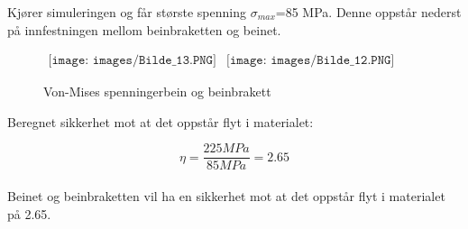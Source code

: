 Kjører simuleringen og får største spenning $\sigma_{max}$=85 MPa. Denne oppstår nederst på innfestningen mellom beinbraketten og beinet.

\begin{figure}[H]
\begin{center}$
\begin{array}{ccc}
\texttt{[image: images/Bilde\_13.PNG]} &
\texttt{[image: images/Bilde\_12.PNG]} &  
\end{array}$
\end{center}
\caption{Von-Mises spenningerbein og beinbrakett}
\end{figure}

Beregnet sikkerhet mot at det oppstår flyt i materialet:

\begin{equation}
\eta=\frac{225 MPa}{85 MPa}=2.65
\end{equation}\\

Beinet og beinbraketten vil ha en sikkerhet mot at det oppstår flyt i materialet på 2.65.
